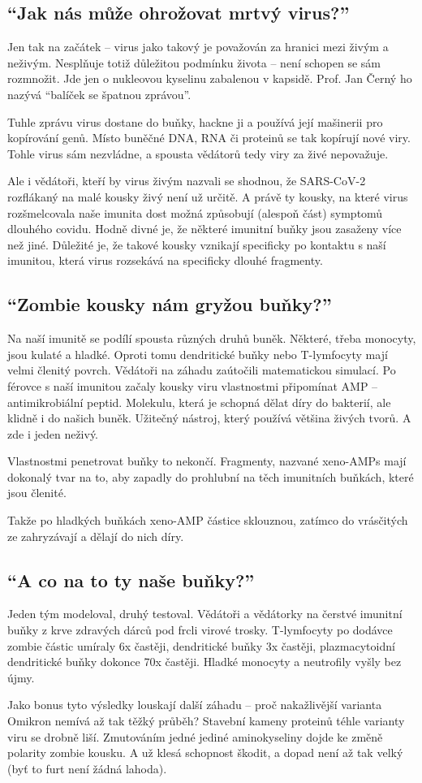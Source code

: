 \documentclass[main.tex]{subfiles}
\begin{document}
\subsection*{\enquote{Jak nás může ohrožovat mrtvý virus?}}
Jen tak na začátek – virus jako takový je považován za hranici mezi živým a neživým. Nesplňuje totiž důležitou podmínku života – není schopen se sám rozmnožit. Jde jen o nukleovou kyselinu zabalenou v kapsidě. Prof. Jan Černý ho nazývá “balíček se špatnou zprávou”.\par
Tuhle zprávu virus dostane do buňky, hackne ji a používá její mašinerii pro kopírování genů. Místo buněčné DNA, RNA či proteinů se tak kopírují nové viry. Tohle virus sám nezvládne, a spousta vědátorů tedy viry za živé nepovažuje. \par
Ale i vědátoři, kteří by virus živým nazvali se shodnou, že SARS-CoV-2 rozflákaný na malé kousky živý není už určitě. A právě ty kousky, na které virus rozšmelcovala naše imunita dost možná způsobují (alespoň část) symptomů dlouhého covidu. Hodně divné je, že některé imunitní buňky jsou zasaženy více než jiné. Důležité je, že takové kousky vznikají specificky po kontaktu s naší imunitou, která virus rozsekává na specificky dlouhé fragmenty.
\subsection*{\enquote{Zombie kousky nám gryžou buňky?}}
Na naší imunitě se podílí spousta různých druhů buněk. Některé, třeba monocyty, jsou kulaté a hladké. Oproti tomu dendritické buňky nebo T-lymfocyty mají velmi členitý povrch. Vědátoři na záhadu zaútočili matematickou simulací. Po férovce s naší imunitou začaly kousky viru vlastnostmi připomínat AMP – antimikrobiální peptid. Molekulu, která je schopná dělat díry do bakterií, ale klidně i do našich buněk. Užitečný nástroj, který používá většina živých tvorů. A zde i jeden neživý.\par
Vlastnostmi penetrovat buňky to nekončí. Fragmenty, nazvané xeno-AMPs mají dokonalý tvar na to, aby zapadly do prohlubní na těch imunitních buňkách, které jsou členité. \par
Takže po hladkých buňkách xeno-AMP částice sklouznou, zatímco do vrásčitých ze zahryzávají a dělají do nich díry.
\subsection*{\enquote{A co na to ty naše buňky?}}
Jeden tým modeloval, druhý testoval. Vědátoři a vědátorky na čerstvé imunitní buňky z krve zdravých dárců pod frcli virové trosky. T-lymfocyty po dodávce zombie částic umíraly 6x častěji, dendritické buňky 3x častěji, plazmacytoidní dendritické buňky dokonce 70x častěji. Hladké monocyty a neutrofily vyšly bez újmy. \par
Jako bonus tyto výsledky louskají další záhadu – proč nakažlivější varianta Omikron nemívá až tak těžký průběh? Stavební kameny proteinů téhle varianty viru se drobně liší. Zmutováním jedné jediné aminokyseliny dojde ke změně polarity zombie kousku. A už klesá schopnost škodit, a dopad není až tak velký (byť to furt není žádná lahoda).
\end{document}
